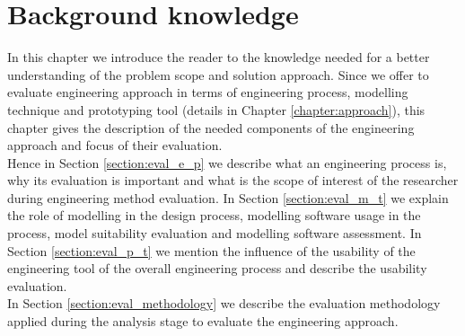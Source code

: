 
\chapter{Background knowledge}\label{chapter:background_knowledge}

In this chapter we introduce the reader to the knowledge needed for a better understanding of the problem scope and solution approach. Since we offer to evaluate engineering approach in terms of engineering process, modelling technique and prototyping tool (details in Chapter \ref{chapter:approach}), this chapter gives the description of the needed components of the engineering approach and focus of their evaluation.\\ 

Hence in Section \ref{section:eval_e_p} we describe what an engineering process is, why its evaluation is important and what is the scope of interest of the researcher during engineering method evaluation. In Section \ref{section:eval_m_t} we explain the role of modelling in the design process, modelling software usage in the process, model suitability evaluation and modelling software assessment. In Section \ref{section:eval_p_t} we mention the influence of the usability of the engineering tool of the overall engineering process and describe the usability evaluation.\\

In Section \ref{section:eval_methodology} we describe the evaluation methodology applied during the analysis stage to evaluate the engineering approach.\\



